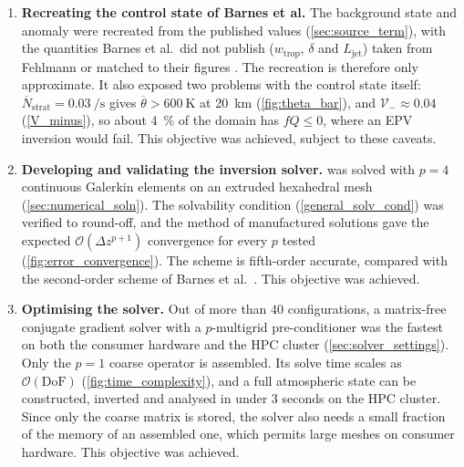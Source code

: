 \documentclass{article}
\begin{document}
\begin{enumerate}
    \item \textbf{Recreating the control state of Barnes et al.}
    The background state and anomaly were recreated from the published values (\cref{sec:source_term}), with the quantities Barnes et al.\ did not publish ($w_\text{trop}$, $\delta$ and $L_\text{jet}$) taken from Fehlmann or matched to their figures \cite{Barnes2022main,fehlmann1997pvelements}.
    The recreation is therefore only approximate.
    It also exposed two problems with the control state itself: $\overline N_\text{strat} = \qty{0.03}{\per\second}$ gives $\overline\theta > \qty{600}{\kelvin}$ at \qty{20}{\kilo\meter} (\cref{fig:theta_bar}), and $\mathcal{V}_- \approx 0.04$ (\cref{V_minus}), so about \qty{4}{\percent} of the domain has $fQ \leq 0$, where an EPV inversion would fail.
    This objective was achieved, subject to these caveats.

    \item \textbf{Developing and validating the inversion solver.}
     was solved with $p = 4$ continuous Galerkin elements on an extruded hexahedral mesh (\cref{sec:numerical_soln}).
    The solvability condition (\cref{general_solv_cond}) was verified to round-off, and the method of manufactured solutions gave the expected $\mathcal{O}(\Delta z^{p+1})$ convergence for every $p$ tested (\cref{fig:error_convergence}).
    The scheme is fifth-order accurate, compared with the second-order scheme of Barnes et al.\ \cite{Barnes2022main}.
    This objective was achieved.

    \item \textbf{Optimising the solver.}
    Out of more than 40 configurations, a matrix-free conjugate gradient solver with a $p$-multigrid pre-conditioner was the fastest on both the consumer hardware and the HPC cluster (\cref{sec:solver_settings}).
    Only the $p = 1$ coarse operator is assembled.
    Its solve time scales as $\mathcal{O}(\text{DoF})$ (\cref{fig:time_complexity}), and a full atmospheric state can be constructed, inverted and analysed in under 3 seconds on the HPC cluster.
    Since only the coarse matrix is stored, the solver also needs a small fraction of the memory of an assembled one, which permits large meshes on consumer hardware.
    This objective was achieved.


\end{enumerate}
\end{document}
